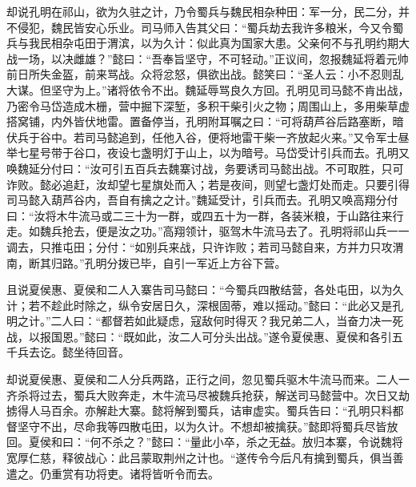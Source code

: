 却说孔明在祁山，欲为久驻之计，乃令蜀兵与魏民相杂种田：军一分，民二分，并不侵犯，魏民皆安心乐业。司马师入告其父曰：“蜀兵劫去我许多粮米，今又令蜀兵与我民相杂屯田于渭滨，以为久计：似此真为国家大患。父亲何不与孔明约期大战一场，以决雌雄？”懿曰：“吾奉旨坚守，不可轻动。”正议间，忽报魏延将着元帅前日所失金盔，前来骂战。众将忿怒，俱欲出战。懿笑曰：“圣人云：小不忍则乱大谋。但坚守为上。”诸将依令不出。魏延辱骂良久方回。孔明见司马懿不肯出战，乃密令马岱造成木栅，营中掘下深堑，多积干柴引火之物；周围山上，多用柴草虚搭窝铺，内外皆伏地雷。置备停当，孔明附耳嘱之曰：“可将葫芦谷后路塞断，暗伏兵于谷中。若司马懿追到，任他入谷，便将地雷干柴一齐放起火来。”又令军士昼举七星号带于谷口，夜设七盏明灯于山上，以为暗号。马岱受计引兵而去。孔明又唤魏延分付曰：“汝可引五百兵去魏寨讨战，务要诱司马懿出战。不可取胜，只可诈败。懿必追赶，汝却望七星旗处而入；若是夜间，则望七盏灯处而走。只要引得司马懿入葫芦谷内，吾自有擒之之计。”魏延受计，引兵而去。孔明又唤高翔分付曰：“汝将木牛流马或二三十为一群，或四五十为一群，各装米粮，于山路往来行走。如魏兵抢去，便是汝之功。”高翔领计，驱驾木牛流马去了。孔明将祁山兵一一调去，只推屯田；分付：“如别兵来战，只许诈败；若司马懿自来，方并力只攻渭南，断其归路。”孔明分拨已毕，自引一军近上方谷下营。

且说夏侯惠、夏侯和二人入寨告司马懿曰：“今蜀兵四散结营，各处屯田，以为久计；若不趁此时除之，纵令安居日久，深根固蒂，难以摇动。”懿曰：“此必又是孔明之计。”二人曰：“都督若如此疑虑，寇敌何时得灭？我兄弟二人，当奋力决一死战，以报国恩。”懿曰：“既如此，汝二人可分头出战。”遂令夏侯惠、夏侯和各引五千兵去讫。懿坐待回音。

却说夏侯惠、夏侯和二人分兵两路，正行之间，忽见蜀兵驱木牛流马而来。二人一齐杀将过去，蜀兵大败奔走，木牛流马尽被魏兵抢获，解送司马懿营中。次日又劫掳得人马百余。亦解赴大寨。懿将解到蜀兵，诘审虚实。蜀兵告曰：“孔明只料都督坚守不出，尽命我等四散屯田，以为久计。不想却被擒获。”懿即将蜀兵尽皆放回。夏侯和曰：“何不杀之？”懿曰：“量此小卒，杀之无益。放归本寨，令说魏将宽厚仁慈，释彼战心：此吕蒙取荆州之计也。“遂传令今后凡有擒到蜀兵，俱当善遣之。仍重赏有功将吏。诸将皆听令而去。

